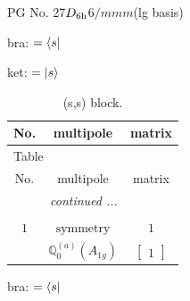 \documentclass[fleqn,8pt,landscape]{jsarticle}
\begin{document}
\setcounter{MaxMatrixCols}{32}

\renewcommand{\tablename}{Table~}
\renewcommand{\figurename}{Figure~}
\begin{center}
\LARGE
PG No. 27\quad$D_{\rm 6h}$\quad$6/mmm$\quad[ hexagonal ] (lg basis)
\end{center}
bra: $=\bra{s}$

\noindent
ket: $=\ket{s}$
\renewcommand{\arraystretch}{1.6}
\begin{longtable}{ccc}
\caption{(s,s) block.}
 \\
 \hline \hline
No. & multipole & matrix \\ \hline \endfirsthead

\multicolumn{2}{l}{\tablename\ \thetable{}} \\
 \hline \hline
No. & multipole & matrix \\ \hline \endhead

 \hline \hline
\multicolumn{2}{r}{\footnotesize\it continued ...} \\ \endfoot

 \hline \hline
\multicolumn{2}{r}{} \\ \endlastfoot

$ 1 $ & $ \text{symmetry} $ & $ 1 $ \\
$  $ & $ \mathbb{Q}_{0}^{(a)}(A_{1g}) $ & $ \begin{bmatrix} 1 \end{bmatrix} $ \\ \hline
\end{longtable}
bra: $=\bra{s}$
\end{document}
